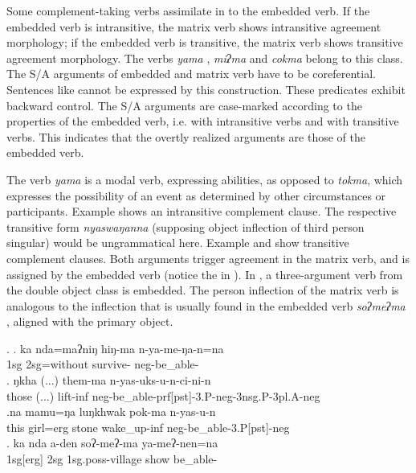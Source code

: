 Some complement-taking verbs assimilate in  to the embedded verb. If the embedded verb is intransitive, the matrix verb shows intransitive agreement morphology; if the embedded verb is transitive, the matrix verb shows transitive agreement morphology. The verbs \emph{yama} , \emph{miʔma}  and \emph{cokma}  belong to this class. The S/A arguments of embedded and matrix verb have to be coreferential. Sentences like  cannot be expressed by this construction. These predicates exhibit backward control. The S/A arguments are case-marked according to the properties of the embedded verb, i.e.  with intransitive verbs and  with transitive verbs. This indicates that the overtly realized arguments are those of the embedded verb.

The verb \emph{yama} is a modal verb, expressing abilities, as opposed to \emph{tokma}, which expresses the possibility of an event as determined by other circumstances or participants. Example \Next[a] shows an intransitive complement clause. The respective transitive form \emph{nyaswaŋanna} (supposing  object inflection of third person singular) would be ungrammatical here. Example \Next[b] and \Next[c] show transitive complement clauses.  Both arguments trigger agreement in the matrix verb, and  is assigned by the embedded verb (notice the  in \Next[c]). In \Next[d], a three-argument verb from the double object class is embedded. The person inflection of the matrix verb is analogous to the inflection that is usually found in the embedded verb  \emph{soʔmeʔma} , aligned with the primary object.

\ex. \ag. ka nda=maʔniŋ hiŋ-ma n-ya-me-ŋa-n=na\\  
	 {\sc 1sg} {\sc 2sg=}without survive-  {\sc neg-}be\_able-\\
\bg. ŋkha (...) them-ma     n-yas-uks-u-n-ci-ni-n\\
those (...) lift{\sc -inf} {\sc neg-}be\_able{\sc -prf[pst]-3.P-neg-3nsg.P-3pl.A-neg}\\
\bg.na   mamu=ŋa   luŋkhwak pok-ma        n-yas-u-n\\
this girl{\sc =erg} stone wake\_up{\sc -inf} {\sc neg-}be\_able{\sc [3sg.A]-3.P[pst]-neg}\\
 
	\bg. ka nda a-den soʔ-meʔ-ma ya-meʔ-nen=na\\
	{\sc 1sg[erg]} {\sc 2sg} {\sc 1sg.poss}-village  show be\_able-\\
	

